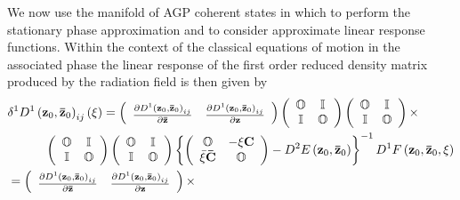 \documentclass[aps,preprint]{revtex4}%
\begin{document}
We now use the manifold of AGP coherent states in which to perform the
stationary phase approximation and to consider approximate linear response
functions. Within the context of the classical equations of motion in the
associated phase the linear response of the first order reduced density matrix
produced by the radiation field is then given by
\begin{align}
&  \delta^{1}D^{1}\left(  \mathbf{z}{_{0},\mathbf{\bar{z}}_{0}}\right)
_{ij}\left(  \xi\right)  =\left(
\begin{array}
[c]{cc}%
\frac{\partial D^{1}\left(  \mathbf{z}_{0},\mathbf{\bar{z}}_{0}\right)  _{ij}%
}{\partial\mathbf{\bar{z}}} & \frac{\partial D^{1}\left(  \mathbf{z}%
_{0},\mathbf{\bar{z}}_{0}\right)  _{ij}}{\partial\mathbf{z}}%
\end{array}
\right)  \left(
\begin{array}
[c]{cc}%
\mathbb{O} & \mathbb{I}\\
\mathbb{I} & \mathbb{O}%
\end{array}
\right)  \left(
\begin{array}
[c]{cc}%
\mathbb{O} & \mathbb{I}\\
\mathbb{I} & \mathbb{O}%
\end{array}
\right)  \times\nonumber\\
&  \quad\quad\quad\left(
\begin{array}
[c]{cc}%
\mathbb{O} & \mathbb{I}\\
\mathbb{I} & \mathbb{O}%
\end{array}
\right)  \left(
\begin{array}
[c]{cc}%
\mathbb{O} & \mathbb{I}\\
\mathbb{I} & \mathbb{O}%
\end{array}
\right)  \left\{  \left(
\begin{array}
[c]{cc}%
\mathbb{O} & -\xi\mathbf{C}\\
\bar{\xi}\mathbf{\bar{C}} & \mathbb{O}%
\end{array}
\right)  -D^{2}E\left(  \mathbf{z}_{0},\mathbf{\bar{z}}_{0}\right)  \right\}
^{-1}D^{1}F\left(  \mathbf{z}_{0},\mathbf{\bar{z}}_{0},\xi\right) \nonumber\\
&  =\left(
\begin{array}
[c]{cc}%
\frac{\partial D^{1}\left(  \mathbf{z}_{0},\mathbf{\bar{z}}_{0}\right)  _{ij}%
}{\partial\mathbf{\bar{z}}} & \frac{\partial D^{1}\left(  \mathbf{z}%
_{0},\mathbf{\bar{z}}_{0}\right)  _{ij}}{\partial\mathbf{z}}%
\end{array}
\right)  \times\nonumber\\

\end{align}
\end{document}
